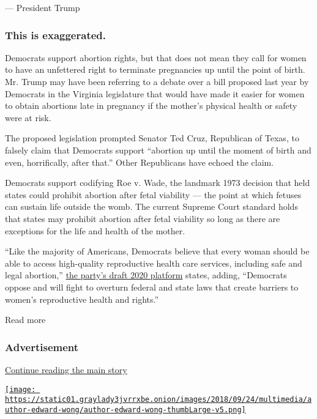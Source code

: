 --- President Trump

\hypertarget{this-is-exaggerated--1}{%
\subsubsection{\texorpdfstring{\textbf{This is exaggerated.}
}{This is exaggerated. }}\label{this-is-exaggerated--1}}

Democrats support abortion rights, but that does not mean they call for
women to have an unfettered right to terminate pregnancies up until the
point of birth. Mr. Trump may have been referring to a debate over a
bill proposed last year by Democrats in the Virginia legislature that
would have made it easier for women to obtain abortions late in
pregnancy if the mother's physical health or safety were at risk.

The proposed legislation prompted Senator Ted Cruz, Republican of Texas,
to falsely claim that Democrats support ``abortion up until the moment
of birth and even, horrifically, after that.'' Other Republicans have
echoed the claim.

Democrats support codifying Roe v. Wade, the landmark 1973 decision that
held states could prohibit abortion after fetal viability --- the point
at which fetuses can sustain life outside the womb. The current Supreme
Court standard holds that states may prohibit abortion after fetal
viability so long as there are exceptions for the life and health of the
mother.

``Like the majority of Americans, Democrats believe that every woman
should be able to access high-quality reproductive health care services,
including safe and legal abortion,''
\href{https://slack-redir.net/link?url=https\%3A\%2F\%2Fwww.demconvention.com\%2Fwp-content\%2Fuploads\%2F2020\%2F07\%2F2020-07-21-DRAFT-Democratic-Party-Platform.pdf}{the
party's draft 2020 platform} states, adding, ``Democrats oppose and will
fight to overturn federal and state laws that create barriers to women's
reproductive health and rights.''

Read more

\hypertarget{advertisement-3}{%
\subsubsection{Advertisement}\label{advertisement-3}}

\protect\hyperlink{after-dfp-ad-mid4}{Continue reading the main story}

\href{https://www.nytimes3xbfgragh.onion/by/edward-wong}{\texttt{[image: https://static01.graylady3jvrrxbe.onion/images/2018/09/24/multimedia/author-edward-wong/author-edward-wong-thumbLarge-v5.png]}}

